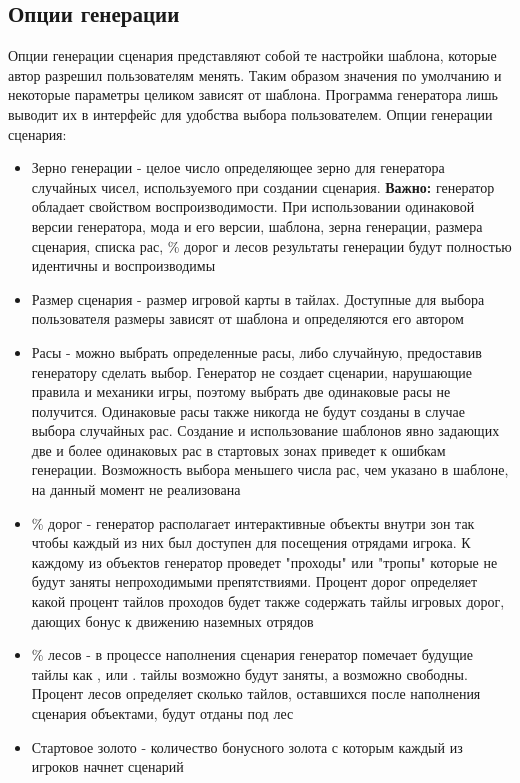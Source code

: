 \newpage
\subsection{Опции генерации}
\label{templateOptions}
Опции генерации сценария представляют собой те настройки шаблона, которые автор разрешил пользователям менять. Таким образом значения по умолчанию и некоторые параметры целиком зависят от шаблона. Программа генератора лишь выводит их в интерфейс для удобства выбора пользователем.
Опции генерации сценария:\\
\begin{itemize}
\item Зерно генерации - целое число определяющее зерно для генератора случайных чисел, используемого при создании сценария. \textbf{Важно:} генератор обладает свойством воспроизводимости. При использовании одинаковой версии генератора, мода и его версии, шаблона, зерна генерации, размера сценария, списка рас, \% дорог и лесов результаты генерации будут полностью идентичны и воспроизводимы
\item Размер сценария - размер игровой карты в тайлах. Доступные для выбора пользователя размеры зависят от шаблона и определяются его автором
\item Расы - можно выбрать определенные расы, либо случайную, предоставив генератору сделать выбор. Генератор не создает сценарии, нарушающие правила и механики игры, поэтому выбрать две одинаковые расы не получится. Одинаковые расы также никогда не будут созданы в случае выбора случайных рас. Создание и использование шаблонов явно задающих две и более одинаковых рас в стартовых зонах приведет к ошибкам генерации. Возможность выбора меньшего числа рас, чем указано в шаблоне, на данный момент не реализована
\item \% дорог - генератор располагает интерактивные объекты внутри зон так чтобы каждый из них был доступен для посещения отрядами игрока. К каждому из объектов генератор проведет "проходы" или "тропы" которые не будут заняты непроходимыми препятствиями. Процент дорог определяет какой процент тайлов проходов будет также содержать тайлы игровых дорог, дающих бонус к движению наземных отрядов
\item \% лесов - в процессе наполнения сценария генератор помечает будущие тайлы как ,  или .  тайлы возможно будут заняты, а возможно свободны. Процент лесов определяет сколько  тайлов, оставшихся после наполнения сценария объектами, будут отданы под лес
\item Стартовое золото - количество бонусного золота с которым каждый из игроков начнет сценарий
\end{itemize}

